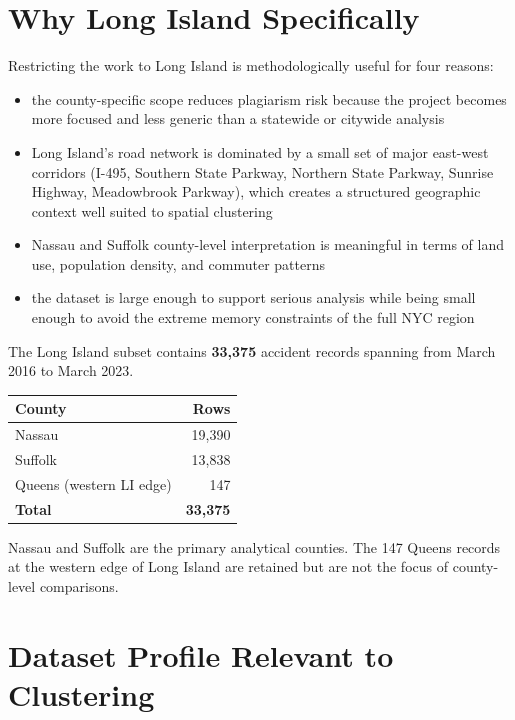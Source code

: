 \documentclass[11pt]{article}
\begin{document}
\section{Why Long Island Specifically}

Restricting the work to Long Island is methodologically useful for four reasons:

\begin{itemize}
\item the county-specific scope reduces plagiarism risk because the project becomes more focused and less generic than a statewide or citywide analysis
\item Long Island's road network is dominated by a small set of major east-west corridors (I-495, Southern State Parkway, Northern State Parkway, Sunrise Highway, Meadowbrook Parkway), which creates a structured geographic context well suited to spatial clustering
\item Nassau and Suffolk county-level interpretation is meaningful in terms of land use, population density, and commuter patterns
\item the dataset is large enough to support serious analysis while being small enough to avoid the extreme memory constraints of the full NYC region
\end{itemize}

The Long Island subset contains \textbf{33,375} accident records spanning from March 2016 to March 2023.

\begin{center}
\begin{tabular}{|l|r|}
\hline
County & Rows \\
\hline
Nassau & 19,390 \\
Suffolk & 13,838 \\
Queens (western LI edge) & 147 \\
\hline
\textbf{Total} & \textbf{33,375} \\
\hline
\end{tabular}
\end{center}

Nassau and Suffolk are the primary analytical counties. The 147 Queens records at the western edge of Long Island are retained but are not the focus of county-level comparisons.

\section{Dataset Profile Relevant to Clustering}
\end{document}
